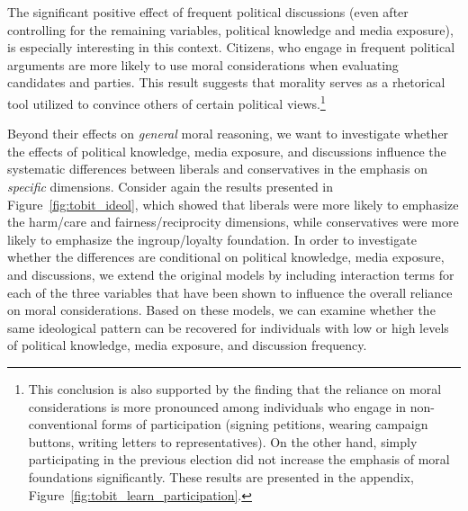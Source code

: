 \documentclass[12pt]{article}
\begin{document}
The significant positive effect of frequent political discussions (even after controlling for the remaining variables, political knowledge and media exposure), is especially interesting in this context. Citizens, who engage in frequent political arguments are more likely to use moral considerations when evaluating candidates and parties. This result suggests that morality serves as a rhetorical tool utilized to convince others of certain political views.\footnote{This conclusion is also supported by the finding that the reliance on moral considerations is more pronounced among individuals who engage in non-conventional forms of participation (signing petitions, wearing campaign buttons, writing letters to representatives). On the other hand, simply participating in the previous election did not increase the emphasis of moral foundations significantly. These results are presented in the appendix, Figure~\ref{fig:tobit_learn_participation}.}

Beyond their effects on \textit{general} moral reasoning, we want to investigate whether the effects of political knowledge, media exposure, and discussions influence the systematic differences between liberals and conservatives in the emphasis on \textit{specific} dimensions. Consider again the results presented in Figure~\ref{fig:tobit_ideol}, which showed that liberals were more likely to emphasize the harm/care and fairness/reciprocity dimensions, while conservatives were more likely to emphasize the ingroup/loyalty foundation. In order to investigate whether the differences are conditional on political knowledge, media exposure, and discussions, we extend the original models by including interaction terms for each of the three variables that have been shown to influence the overall reliance on moral considerations. Based on these models, we can examine whether the same ideological pattern can be recovered for individuals with low or high levels of political knowledge, media exposure, and discussion frequency.
\end{document}
